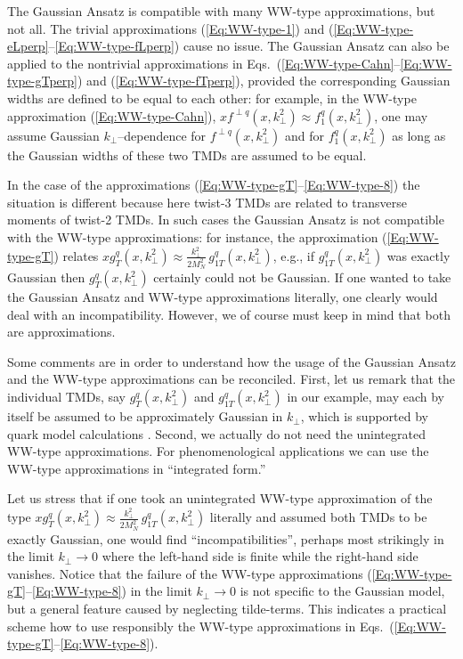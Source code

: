 \documentclass[a4paper,11pt]{article}
\def\kperp{k_\perp}
\begin{document}
The Gaussian Ansatz is compatible with many WW-type approximations,
but not all. The trivial approximations (\ref{Eq:WW-type-1}) and
(\ref{Eq:WW-type-eLperp}--\ref{Eq:WW-type-fLperp}) cause no issue.
The Gaussian Ansatz can also be applied to the nontrivial approximations
in Eqs.~(\ref{Eq:WW-type-Cahn}--\ref{Eq:WW-type-gTperp})
and (\ref{Eq:WW-type-fTperp}), provided the corresponding Gaussian
widths are defined to be equal to each other: for example, in the
WW-type approximation (\ref{Eq:WW-type-Cahn}),
$xf^{\perp q}(x,\kperp^2)\approx f_1^q(x,\kperp^2)$, one may
assume Gaussian $\kperp$--dependence for $f^{\perp q}(x,\kperp^2)$
and for $f_1^q(x,\kperp^2)$ as long as the Gaussian widths
of these two TMDs are assumed to be equal.

In the case of the approximations
(\ref{Eq:WW-type-gT}--\ref{Eq:WW-type-8})
the situation is different because here twist-3 TMDs
are related to transverse moments of twist-2 TMDs. In such cases the
Gaussian Ansatz is not compatible with the WW-type approximations:
for instance, the approximation (\ref{Eq:WW-type-gT}) relates
$xg_T^q(x,\kperp^2)\approx\frac{k_\perp^2}{2M_N^2}\,g_{1T}^{q}(x,\kperp^2)$,
e.g., if $g_{1T}^q(x,\kperp^2)$ was exactly Gaussian then
$g_T^q(x,\kperp^2)$ certainly could not be Gaussian. If one wanted to take
the Gaussian Ansatz and WW-type approximations literally, one clearly
would deal with an incompatibility. However, we of course must keep
in mind that both are approximations.

Some comments are in order to understand how the usage of the Gaussian
Ansatz and the WW-type approximations can be reconciled.
First, let us remark that the individual TMDs, say
$g_T^q(x,\kperp^2)$ and $g_{1T}^{q}(x,\kperp^2)$ in our example,
may each by itself be assumed to be approximately Gaussian in $k_\perp$,
which is supported by quark model calculations \cite{Avakian:2010br}.
Second, we actually do not need the unintegrated WW-type approximations.
For phenomenological applications we can use the WW-type approximations
in ``integrated form.''

Let us stress that if one took an unintegrated WW-type approximation of the
type $xg_T^q(x,\kperp^2)\approx\frac{k_\perp^2}{2M_N^2}\,g_{1T}^{q}(x,\kperp^2)$
literally and assumed both TMDs to be exactly Gaussian, one would find
``incompatibilities'', perhaps most strikingly in the limit $k_\perp\to 0$
where the left-hand side is finite while the right-hand side vanishes.
%
%
Notice that the failure of the WW-type approximations
(\ref{Eq:WW-type-gT}--\ref{Eq:WW-type-8}) in the limit $k_\perp\to 0$ is
not specific to the Gaussian model,
but a general feature caused by neglecting tilde-terms. This indicates
a practical scheme how to use responsibly the WW-type approximations in
Eqs.~(\ref{Eq:WW-type-gT}--\ref{Eq:WW-type-8}).
\end{document}
